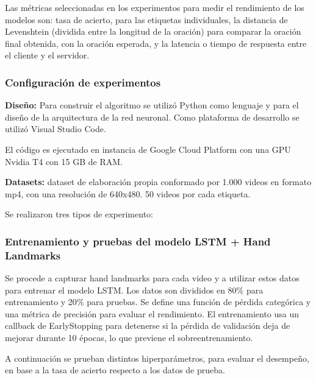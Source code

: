 \documentclass[10pt]{article}
\begin{document}
\vspace{1\baselineskip}
Las métricas seleccionadas en los experimentos para medir el rendimiento de los modelos son: tasa de acierto, para las etiquetas individuales, la distancia de Levenshtein (dividida entre la longitud de la oración) para comparar la oración final obtenida, con la oración esperada, y la latencia o tiempo de respuesta entre el cliente y el servidor.

\subsubsection{Configuración de experimentos}

\vspace{1\baselineskip}
\textbf{Diseño: }Para construir el algoritmo se utilizó Python como lenguaje y para el diseño de la arquitectura de la red neuronal. Como plataforma de desarrollo se utilizó Visual Studio Code.

El código es ejecutado en instancia de Google Cloud Platform con una GPU Nvidia T4 con 15 GB de RAM.

\vspace{1\baselineskip}
\textbf{Datasets: }dataset de elaboración propia  conformado por 1.000 videos en formato mp4, con una resolución de 640x480. 50 videos por cada etiqueta.

\vspace{1\baselineskip}
Se realizaron tres tipos de experimento: 

\subsubsection{Entrenamiento y pruebas del modelo LSTM + Hand Landmarks}

Se procede a capturar hand landmarks para cada video y a utilizar estos datos para entrenar el modelo LSTM. Los datos son divididos en 80$\%$ para entrenamiento y 20$\%$ para pruebas. Se define una función de pérdida categórica y una métrica de precisión para evaluar el rendimiento. El entrenamiento usa un callback de EarlyStopping para detenerse si la pérdida de validación deja de mejorar durante 10 épocas, lo que previene el sobreentrenamiento. 

\vspace{1\baselineskip}
A continuación se prueban distintos hiperparámetros, para evaluar el desempeño, en base a la tasa de acierto respecto a los datos de prueba.

\vspace{1\baselineskip}
\end{document}
